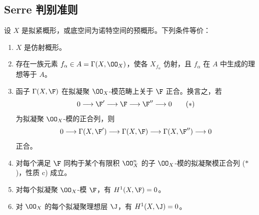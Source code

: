 \subsection{Serre 判别准则}

设 $X$ 是拟紧概形，或底空间为诺特空间的预概形。下列条件等价：
\begin{enumerate}[label=\textup{a)}]
\item $X$ 是仿射概形。
\item[\textup{b)}] 存在一族元素 $f_\alpha\in A=\Gamma(X,\OO_X)$，使各 $X_{f_\alpha}$ 仿射，且 $f_\alpha$ 在 $A$ 中生成的理想等于 $A$。
\item[\textup{c)}] 函子 $\Gamma(X,\F)$ 在拟凝聚 $\OO_X$-模范畴上关于 $\F$ 正合。换言之，若
\begin{equation}
0\longrightarrow\F'\longrightarrow\F\longrightarrow\F''\longrightarrow0
\tag{$*$}
\end{equation}
为拟凝聚 $\OO_X$-模的正合列，则
\[
0\longrightarrow\Gamma(X,\F')\longrightarrow\Gamma(X,\F)
\longrightarrow\Gamma(X,\F'')\longrightarrow0
\]
正合。
\item[\textup{c')}] 对每个满足 $\F$ 同构于某个有限积 $\OO_X^n$ 的子 $\OO_X$-模的拟凝聚模正合列 \textup{($*$)}，性质 \textup{c)} 成立。
\item[\textup{d)}] 对每个拟凝聚 $\OO_X$-模 $\F$，有 $H^1(X,\F)=0$。
\item[\textup{d')}] 对 $\OO_X$ 的每个拟凝聚理想层 $\J$，有 $H^1(X,\J)=0$。
\end{enumerate}
